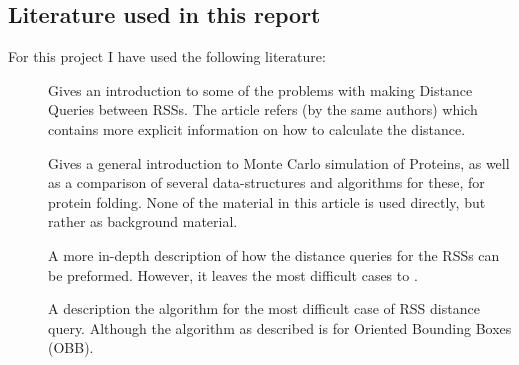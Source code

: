 \subsection{Literature used in this report}
For this project I have used the following literature: 
\begin{description}
\item[\cite{larsen00fast}] Gives an introduction to some of the problems with making Distance Queries between RSSs. The article refers \cite{Larsen99fastproximity} (by the same authors) which contains more explicit information on how to calculate the distance. 
\item[\cite{Lotan03algorithmand}] Gives a general introduction to Monte Carlo simulation of Proteins, as well as a comparison of several data-structures and algorithms for these, for protein folding. None of the material in this article is used directly, but rather as background material.
\item[\cite{Larsen99fastproximity}] A more in-depth description of how the distance queries for the RSSs can be preformed. However, it leaves the most difficult cases to \cite{237244}.
\item[\cite{237244}] A description the algorithm for the most difficult case of RSS distance query. Although the algorithm as described is for Oriented Bounding Boxes (OBB).
\end{description}
